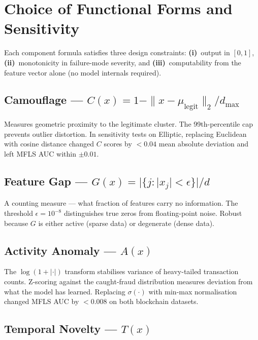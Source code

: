 \documentclass[journal]{IEEEtran}
\begin{document}

\section{Choice of Functional Forms and Sensitivity}
\label{app:sensitivity}

Each component formula satisfies three design constraints: \textbf{(i)}~output in $[0,1]$, \textbf{(ii)}~monotonicity in failure-mode severity, and \textbf{(iii)}~computability from the feature vector alone (no model internals required).

\subsection{Camouflage --- $C(x) = 1 - \|x - \mu_{\text{legit}}\|_2 / d_{\max}$}

Measures geometric proximity to the legitimate cluster. The 99th-percentile cap prevents outlier distortion. In sensitivity tests on Elliptic, replacing Euclidean with cosine distance changed $C$ scores by $<0.04$ mean absolute deviation and left MFLS AUC within $\pm 0.01$.

\subsection{Feature Gap --- $G(x) = |\{j : |x_j| < \epsilon\}| / d$}

A counting measure --- what fraction of features carry no information. The threshold $\epsilon = 10^{-8}$ distinguishes true zeros from floating-point noise. Robust because $G$ is either active (sparse data) or degenerate (dense data).

\subsection{Activity Anomaly --- $A(x)$}

The $\log(1+|\cdot|)$ transform stabilises variance of heavy-tailed transaction counts. Z-scoring against the caught-fraud distribution measures deviation from what the model has learned. Replacing $\sigma(\cdot)$ with min-max normalisation changed MFLS AUC by $<0.008$ on both blockchain datasets.

\subsection{Temporal Novelty --- $T(x)$}
\end{document}
